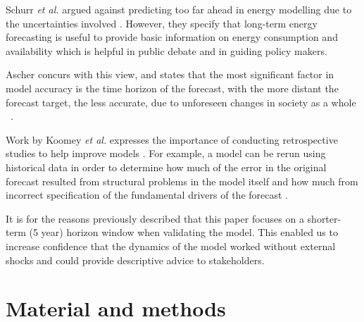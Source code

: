 \documentclass[final,3p,times,twocolumn,numbers]{elsarticle}
\begin{document}
Schurr \textit{et al.} argued against predicting too far ahead in energy modelling due to the uncertainties involved \cite{Schurr_1961}. However, they specify that long-term energy forecasting is useful to provide basic information on energy consumption and availability which is helpful in public debate and in guiding policy makers.


Ascher concurs with this view, and states that the most significant factor in model accuracy is the time horizon of the forecast, with the more distant the forecast target, the less accurate, due to unforeseen changes in society as a whole ~\cite{gillespie_1979}.

Work by Koomey \textit{et al.} expresses the importance of conducting retrospective studies to help improve models \cite{Koomey2003}. For example, a model can be rerun using historical data in order to determine how much of the error in the original forecast resulted from structural problems in the model itself and how much from incorrect specification of the fundamental drivers of the forecast \cite{Koomey2003}.


It is for the reasons previously described that this paper focuses on a shorter-term (5 year) horizon window when validating the model. This enabled us to increase confidence that the dynamics of the model worked without external shocks and could provide descriptive advice to stakeholders.





\section{Material and methods}
\label{sec:methods}
\end{document}
